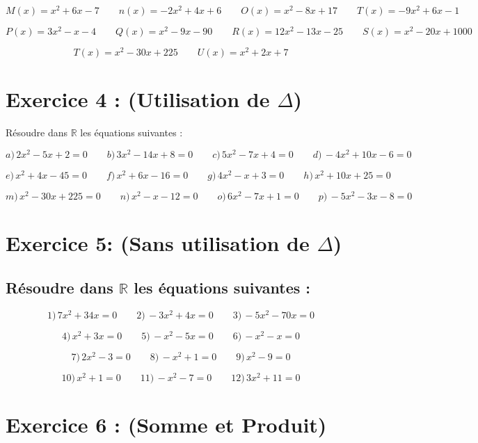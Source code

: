 \documentclass[12pt]{article}
\begin{document}
\[
M(x) = x^2 + 6x - 7 \quad\quad n(x) = -2x^2 + 4x + 6 \quad\quad O(x) = x^2 - 8x + 17 \quad\quad T(x) = -9x^2 + 6x - 1
\]

\[
P(x) = 3x^2 - x - 4 \quad\quad Q(x) = x^2 - 9x - 90 \quad\quad R(x) = 12x^2 - 13x - 25 \quad\quad S(x) = x^2 - 20x + 1000
\]

\[
T(x) = x^2 - 30x + 225 \quad\quad U(x) = x^2 + 2x + 7
\]

\section*{Exercice 4 : (Utilisation de \(\Delta\))}

Résoudre dans \(\mathbb{R}\) les équations suivantes :

\[
a) \, 2x^2 - 5x + 2 = 0 \quad\quad b) \, 3x^2 - 14x + 8 = 0 \quad\quad c) \, 5x^2 - 7x + 4 = 0 \quad\quad d) \, -4x^2 + 10x - 6 = 0
\]

\[
e) \, x^2 + 4x - 45 = 0 \quad\quad f) \, x^2 + 6x - 16 = 0 \quad\quad g) \, 4x^2 - x + 3 = 0 \quad\quad h) \, x^2 + 10x + 25 = 0
\]

\[
m) \, x^2 - 30x + 225 = 0 \quad\quad n) \, x^2 - x - 12 = 0 \quad\quad o) \, 6x^2 - 7x + 1 = 0 \quad\quad p) \, -5x^2 - 3x - 8 = 0
\]

\section*{Exercice 5: (Sans utilisation de \(\Delta\))}

\subsection*{Résoudre dans \(\mathbb{R}\) les équations suivantes :}

\[
1) \, 7x^2 + 34x = 0 \quad\quad 2) \, -3x^2 + 4x = 0 \quad\quad 3) \, -5x^2 - 70x = 0
\]

\[
4) \, x^2 + 3x = 0 \quad\quad 5) \, -x^2 - 5x = 0 \quad\quad 6) \, -x^2 - x = 0
\]

\[
7) \, 2x^2 - 3 = 0 \quad\quad 8) \, -x^2 + 1 = 0 \quad\quad 9) \, x^2 - 9 = 0
\]

\[
10) \, x^2 + 1 = 0 \quad\quad 11) \, -x^2 - 7 = 0 \quad\quad 12) \, 3x^2 + 11 = 0
\]

\section*{Exercice 6 : (Somme et Produit)}
\end{document}
